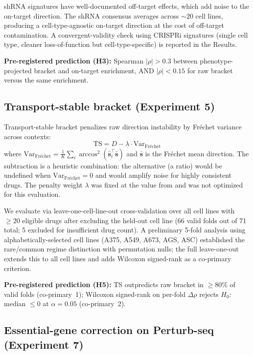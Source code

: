 \documentclass{article}
\begin{document}
shRNA signatures have well-documented off-target effects, which add noise
to the on-target direction. The shRNA consensus averages across
${\sim}20$ cell lines, producing a cell-type-agnostic on-target
direction at the cost of off-target contamination. A convergent-validity
check using CRISPRi signatures (single cell type, cleaner
loss-of-function but cell-type-specific) is reported in the Results.

\textbf{Pre-registered prediction (H3):} Spearman $|\rho| > 0.3$ between
phenotype-projected bracket and on-target enrichment, AND $|\rho| < 0.15$
for raw bracket versus the same enrichment.

\subsection{Transport-stable bracket (Experiment 5)}

Transport-stable bracket penalizes raw direction instability by Fr\'{e}chet
variance across contexts:
\begin{equation}
  \text{TS} = D - \lambda \cdot \text{Var}_{\text{Fr\'echet}}
  \label{eq:ts}
\end{equation}
where $\text{Var}_{\text{Fr\'echet}} = \frac{1}{K}\sum_i
\arccos^2(\hat{\mathbf{s}}_i^\top \bar{\mathbf{s}})$ and
$\bar{\mathbf{s}}$ is the Fr\'echet mean direction. The subtraction is a
heuristic combination: the alternative (a ratio) would be undefined when
$\text{Var}_{\text{Fr\'echet}} = 0$ and would amplify noise for highly
consistent drugs. The penalty weight $\lambda$ was fixed at the value from
\citet{tower2026bracket} and was not optimized for this evaluation.

We evaluate via leave-one-cell-line-out cross-validation over all cell
lines with $\geq 20$ eligible drugs after excluding the held-out cell line
(66 valid folds out of 71 total; 5 excluded for insufficient drug count).
A preliminary 5-fold analysis using alphabetically-selected cell lines
(A375, A549, A673, AGS, ASC) established the rare/common regime distinction
with permutation nulls; the full leave-one-out extends this to all cell
lines and adds Wilcoxon signed-rank as a co-primary criterion.

\textbf{Pre-registered prediction (H5):} TS outpredicts raw bracket
in $\geq 80\%$ of valid folds (co-primary~1); Wilcoxon signed-rank on
per-fold $\Delta\rho$ rejects $H_0$: median $\leq 0$ at $\alpha = 0.05$
(co-primary~2).

\subsection{Essential-gene correction on Perturb-seq (Experiment 7)}
\end{document}
